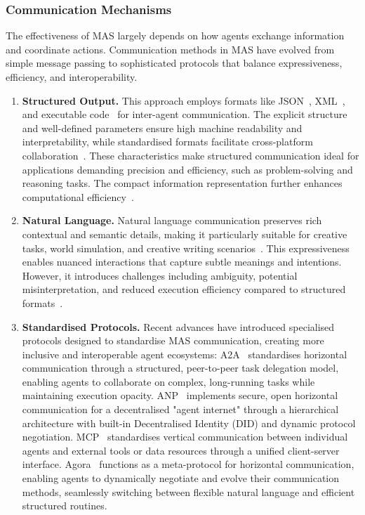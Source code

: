 \documentclass[]{selfevolagent}
\theoremstyle{plain}
\theoremstyle{definition}
\theoremstyle{remark}
\begin{document}
\subsubsection{Communication Mechanisms}
The effectiveness of MAS largely depends on how agents exchange information and coordinate actions. Communication methods in MAS have evolved from simple message passing to sophisticated protocols that balance expressiveness, efficiency, and interoperability.
\begin{enumerate}[label=(\arabic*)]
    \item \textbf{Structured Output.} This approach employs formats like JSON~\citep{li2025graphteamfacilitatinglargelanguage,chen2024internetagentsweavingweb}, XML~\citep{zhang2023appagentmultimodalagentssmartphone,kong2025surveyllmdrivenaiagent}, and executable code~\citep{smolagents} for inter-agent communication. The explicit structure and well-defined parameters ensure high machine readability and interpretability, while standardised formats facilitate cross-platform collaboration~\citep{chen2024internetagentsweavingweb}. These characteristics make structured communication ideal for applications demanding precision and efficiency, such as problem-solving and reasoning tasks. The compact information representation further enhances computational efficiency~\citep{wang2024executablecodeactionselicit}.
    \item \textbf{Natural Language.} Natural language communication preserves rich contextual and semantic details, making it particularly suitable for creative tasks, world simulation, and creative writing scenarios~\citep{liu2025advances}. This expressiveness enables nuanced interactions that capture subtle meanings and intentions. However, it introduces challenges including ambiguity, potential misinterpretation, and reduced execution efficiency compared to structured formats~\citep{guo2024large,yang2025surveyaiagentprotocols,kong2025surveyllmdrivenaiagent}.
    \item \textbf{Standardised Protocols.} Recent advances have introduced specialised protocols designed to standardise MAS communication, creating more inclusive and interoperable agent ecosystems: A2A~\citep{A2A_Protocol_2025} standardises horizontal communication through a structured, peer-to-peer task delegation model, enabling agents to collaborate on complex, long-running tasks while maintaining execution opacity. ANP~\citep{ANP_Protocol_2025} implements secure, open horizontal communication for a decentralised "agent internet" through a hierarchical architecture with built-in Decentralised Identity (DID) and dynamic protocol negotiation. MCP~\citep{MCP_Protocol_2025} standardises vertical communication between individual agents and external tools or data resources through a unified client-server interface. Agora~\citep{Agora_Protocol_2025} functions as a meta-protocol for horizontal communication, enabling agents to dynamically negotiate and evolve their communication methods, seamlessly switching between flexible natural language and efficient structured routines.
\end{enumerate}
\end{document}
